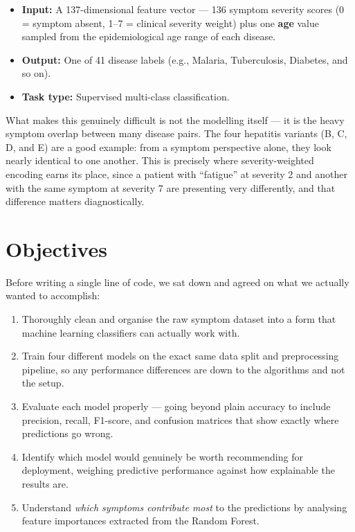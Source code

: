 \documentclass[12pt,a4paper]{article}
\begin{document}
\begin{itemize}
    \item \textbf{Input:} A 137-dimensional feature vector --- 136 symptom severity scores (0 = symptom absent, 1--7 = clinical severity weight) plus one \textbf{age} value sampled from the epidemiological age range of each disease.
    \item \textbf{Output:} One of 41 disease labels (e.g., Malaria, Tuberculosis, Diabetes, and so on).
    \item \textbf{Task type:} Supervised multi-class classification.
\end{itemize}

What makes this genuinely difficult is not the modelling itself --- it is the heavy symptom overlap between many disease pairs. The four hepatitis variants (B, C, D, and E) are a good example: from a symptom perspective alone, they look nearly identical to one another. This is precisely where severity-weighted encoding earns its place, since a patient with ``fatigue'' at severity 2 and another with the same symptom at severity 7 are presenting very differently, and that difference matters diagnostically.

\section{Objectives}

Before writing a single line of code, we sat down and agreed on what we actually wanted to accomplish:

\begin{enumerate}
    \item Thoroughly clean and organise the raw symptom dataset into a form that machine learning classifiers can actually work with.
    \item Train four different models on the exact same data split and preprocessing pipeline, so any performance differences are down to the algorithms and not the setup.
    \item Evaluate each model properly --- going beyond plain accuracy to include precision, recall, F1-score, and confusion matrices that show exactly where predictions go wrong.
    \item Identify which model would genuinely be worth recommending for deployment, weighing predictive performance against how explainable the results are.
    \item Understand \textit{which symptoms contribute most} to the predictions by analysing feature importances extracted from the Random Forest.
\end{enumerate}
\end{document}
